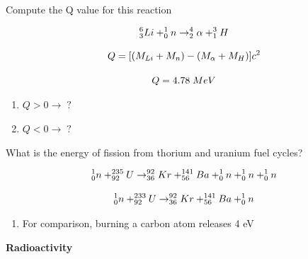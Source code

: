 \documentclass[aspectratio=1610,pdftex,dvipsnames,compress,xcolor={dvipsnames}]{beamer}
\begin{document}
\begin{frame}{Compute the Q value for this reaction}

    \begin{equation}
        \LARGE
        ^6_3Li + ^1_0n \rightarrow ^4_2\alpha + ^3_1H
    \end{equation}

    \begin{equation}
        \LARGE
        Q = [(M_{Li} + M_n) - (M_{\alpha} + M_H)]c^2
    \end{equation}

    \begin{equation}
        \LARGE
        Q = 4.78 \; MeV
    \end{equation}

    \vspace*{\fill}

    \begin{enumerate}[series=outerlist,topsep=0pt,itemsep=21pt,leftmargin=*,label=(\arabic*)]
        \item[]\LARGE $Q > 0 \rightarrow \; ?$
        \item[]\LARGE $Q < 0 \rightarrow \; ?$
    \end{enumerate}
\end{frame}


\begin{frame}{What is the energy of fission from thorium and uranium fuel cycles?}

    \begin{equation}
        \LARGE
        ^1_0n + ^{235}_{92}U \rightarrow ^{92}_{36}Kr + ^{141}_{56}Ba + ^1_0n + ^1_0n + ^1_0n  
    \end{equation}

    \begin{equation}
        \LARGE
        ^1_0n + ^{233}_{92}U \rightarrow ^{92}_{36}Kr + ^{141}_{56}Ba + ^1_0n   
    \end{equation}

    \vspace*{\fill}

    \begin{enumerate}[series=outerlist,topsep=0pt,itemsep=21pt,leftmargin=*,label=(\arabic*)]
        \item[]For comparison, burning a carbon atom releases 4 eV
    \end{enumerate}
\end{frame}


\begin{frame}[plain]{}
    \centering\LARGE\textbf{Radioactivity}
\end{frame}
\end{document}
